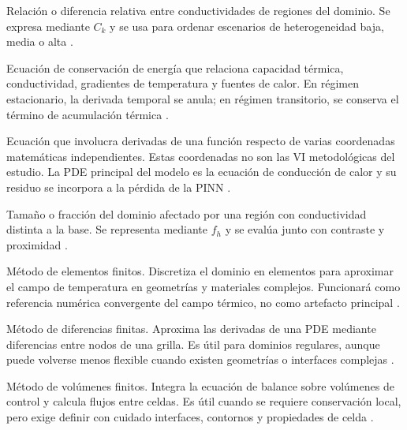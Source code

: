 \documentclass[11pt,a4paper,oneside]{report}
\begin{document}
\begin{description}[style=nextline,itemsep=0.5\baselineskip,parsep=0pt,topsep=0.25\baselineskip]
  \item[Contraste de conductividad.] Relación o diferencia relativa entre conductividades de regiones del dominio. Se expresa mediante $C_k$ y se usa para ordenar escenarios de heterogeneidad baja, media o alta \parencites{farouki1981thermal,devries1966thermal}[1,6--9]{khumalo2025}[1,10,16]{kim2025}.

  \item[Ecuación de conducción de calor.] Ecuación de conservación de energía que relaciona capacidad térmica, conductividad, gradientes de temperatura y fuentes de calor. En régimen estacionario, la derivada temporal se anula; en régimen transitorio, se conserva el término de acumulación térmica \parencites{carslaw1959conduction,kakac2018heatConduction,hahn2012heatConduction}[1,3]{xing2023}[1,3,16]{pan2025}.

  \item[Ecuación diferencial en derivadas parciales o PDE.] Ecuación que involucra derivadas de una función respecto de varias coordenadas matemáticas independientes. Estas coordenadas no son las VI metodológicas del estudio. La PDE principal del modelo es la ecuación de conducción de calor y su residuo se incorpora a la pérdida de la PINN \parencites[686--690]{raissi2019}[1--2]{lawal2022}.

  \item[Extensión de heterogeneidad.] Tamaño o fracción del dominio afectado por una región con conductividad distinta a la base. Se representa mediante $f_h$ y se evalúa junto con contraste y proximidad \parencites[4--6]{enescu2021}[1,6--9]{khumalo2025}[1,10,16]{kim2025}.

  \item[FEM.] Método de elementos finitos. Discretiza el dominio en elementos para aproximar el campo de temperatura en geometrías y materiales complejos. Funcionará como referencia numérica convergente del campo térmico, no como artefacto principal \parencites[4--6]{enescu2021}{patankar1980numerical}[3--4,93--99]{cigre2025}.

  \item[FDM.] Método de diferencias finitas. Aproxima las derivadas de una PDE mediante diferencias entre nodos de una grilla. Es útil para dominios regulares, aunque puede volverse menos flexible cuando existen geometrías o interfaces complejas \parencites{patankar1980numerical}[3--4,93--99]{cigre2025}.

  \item[FVM.] Método de volúmenes finitos. Integra la ecuación de balance sobre volúmenes de control y calcula flujos entre celdas. Es útil cuando se requiere conservación local, pero exige definir con cuidado interfaces, contornos y propiedades de celda \parencite{patankar1980numerical}.


\end{description}
\end{document}
